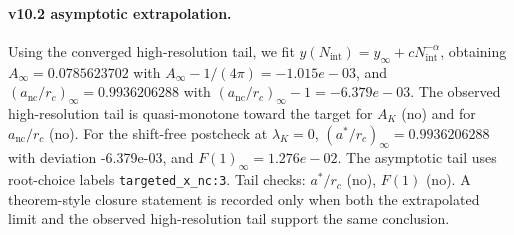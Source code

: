 \paragraph{v10.2 asymptotic extrapolation.}
Using the converged high-resolution tail, we fit $y(N_{\mathrm{int}})=y_{\infty}+cN_{\mathrm{int}}^{-\alpha}$, obtaining $A_\infty=0.0785623702$ with $A_\infty-1/(4\pi)=-1.015e-03$, and $(a_{\mathrm{nc}}/r_c)_\infty=0.9936206288$ with $(a_{\mathrm{nc}}/r_c)_\infty-1=-6.379e-03$. The observed high-resolution tail is quasi-monotone toward the target for $A_K$ (no) and for $a_{\mathrm{nc}}/r_c$ (no). For the shift-free postcheck at $\lambda_K=0$, $(a^*/r_c)_\infty=0.9936206288$ with deviation -6.379e-03, and $F(1)_\infty=1.276e-02$. The asymptotic tail uses root-choice labels \texttt{targeted_x_nc:3}. Tail checks: $a^*/r_c$ (no), $F(1)$ (no). A theorem-style closure statement is recorded only when both the extrapolated limit and the
observed high-resolution tail support the same conclusion.
